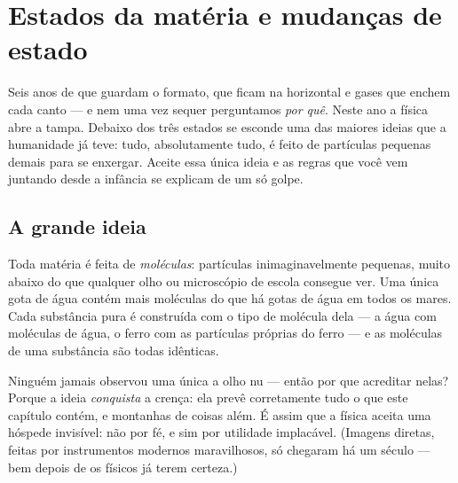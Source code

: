 \chapter{Estados da matéria e mudanças de estado}\label{ch:g7:states-of-matter}

Seis anos de  que guardam o formato,  que ficam na
horizontal e gases que enchem cada canto --- e nem uma vez sequer
perguntamos \emph{por quê}. Neste ano a física abre a tampa. Debaixo
dos três estados se esconde uma das maiores ideias que a humanidade
já teve: tudo, absolutamente tudo, é feito de partículas pequenas
demais para se enxergar. Aceite essa única ideia e as regras que você
vem juntando desde a infância se explicam de um só golpe.

\section{A grande ideia}

\begin{definition}[Moléculas]\label{def:g7:states-of-matter:molecule}
Toda matéria é feita de \emph{moléculas}: partículas
inimaginavelmente pequenas, muito abaixo do que qualquer olho ou
microscópio de escola consegue ver. Uma única gota de água contém
mais moléculas do que há gotas de água em todos os mares. Cada
substância pura é construída com o tipo de molécula dela --- a água
com moléculas de água, o ferro com as partículas próprias do ferro
--- e as moléculas de uma substância são todas idênticas.
\end{definition}

\begin{remark}\label{rem:g7:states-of-matter:believing}
Ninguém jamais observou uma única  a olho nu --- então por
que acreditar nelas? Porque a ideia \emph{conquista} a crença: ela
prevê corretamente tudo o que este capítulo contém, e montanhas de
coisas além. É assim que a física aceita uma hóspede invisível: não
por fé, e sim por utilidade implacável. (Imagens diretas, feitas por
instrumentos modernos maravilhosos, só chegaram há um século --- bem
depois de os físicos já terem certeza.)
\end{remark}

